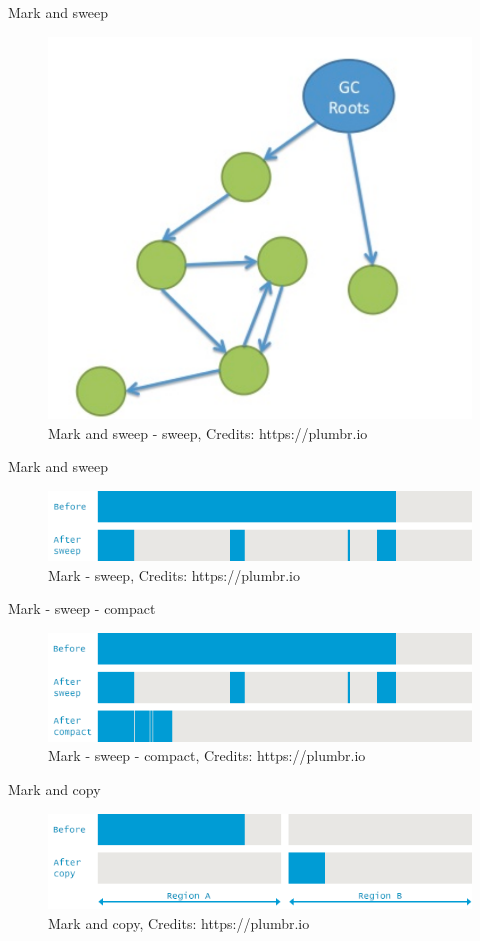 \documentclass{beamer}
\begin{document}
\begin{frame}{Mark and sweep}
\begin{figure}
	\centering
	\includegraphics[width=0.6\linewidth]{Images/gc3}
	\caption{Mark and sweep - sweep, Credits: https://plumbr.io}
	\label{fig:sweep}
\end{figure}
\end{frame}

\begin{frame}{Mark and sweep}
\begin{figure}
	\centering
	\includegraphics[width=\linewidth]{Images/gcsweep}
	\caption{Mark - sweep, Credits: https://plumbr.io}
	\label{fig:sweeporig}
\end{figure}
\end{frame}

\begin{frame}{Mark - sweep - compact}
\begin{figure}
	\centering
	\includegraphics[width=\linewidth]{Images/gccompact}
	\caption{Mark - sweep - compact, Credits: https://plumbr.io}
	\label{fig:sweepcompact}
\end{figure}
\end{frame}

\begin{frame}{Mark and copy}
\begin{figure}
	\centering
	\includegraphics[width=\linewidth]{Images/gccopy}
	\caption{Mark and copy, Credits: https://plumbr.io}
	\label{fig:sweepcopy}
\end{figure}
\end{frame}
\end{document}
